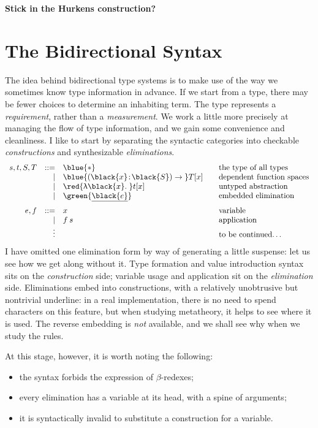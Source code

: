 \documentclass[natbib]{article}
\newcommand{\type}{\blue{\ast}}
\newcommand{\hb}{\!:\!}
\newcommand{\PI}[2]{\blue{(\black{#1}\hb \black{#2})\to\;}}
\newcommand{\LA}[1]{\red{\uplambda\black{#1}.\;}}
\begin{document}
\textbf{Stick in the Hurkens construction?}


\section{The Bidirectional Syntax}

\newcommand{\CHK}[3]{#1 \vdash #2 \ni #3}
\newcommand{\SYN}[3]{#1 \vdash #2 \in #3}
\newcommand{\el}[1]{\green{\underline{\black{#1}}}}

The idea behind bidirectional type systems is to make use of the way we sometimes know type information in advance. If we start from a type, there may be fewer choices to determine an inhabiting term. The type represents a \emph{requirement}, rather than a \emph{measurement}. We work a little more precisely at managing the flow of type information, and we gain some convenience and cleanliness. I like to start by separating the syntactic categories into checkable \emph{constructions} and synthesizable \emph{eliminations}.
\[\begin{array}{rrl@{\qquad}l}
s,t,S,T & ::= & \type & \mbox{the type of all types} \\
        &   | & \PI xS T[x] & \mbox{dependent function spaces} \\
        &   | & \LA x t[x] & \mbox{untyped abstraction} \\
        &   | & \el e & \mbox{embedded elimination} \medskip \\
e,f     & ::= & x     & \mbox{variable} \\
        &   | & f\:s  & \mbox{application} \\
        &   \vdots &  & \mbox{to be continued\ldots}
\end{array}\]
I have omitted one elimination form by way of generating a little suspense: let us see how we get along without it. Type formation and value introduction syntax sits on the \emph{construction} side; variable usage and application sit on the \emph{elimination} side. Eliminations embed into constructions, with a relatively unobtrusive but nontrivial underline: in a real implementation, there is no need to spend characters on this feature, but when studying metatheory, it helps to see where it is used. The reverse embedding is \emph{not} available, and we shall see why when we study the rules.

At this stage, however, it is worth noting the following:
\begin{itemize}
\item the syntax forbids the expression of $\beta$-redexes;
\item every elimination has a variable at its head, with a spine of arguments;
\item it is syntactically invalid to substitute a construction for a variable.
\end{itemize}
\end{document}
